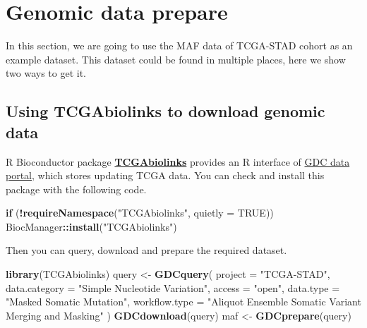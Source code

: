 \documentclass[
  12pt,
]{book}
\newenvironment{Shaded}{\begin{snugshade}}{\end{snugshade}}
\newcommand{\AttributeTok}[1]{\textcolor[rgb]{0.13,0.29,0.53}{#1}}
\newcommand{\ConstantTok}[1]{\textcolor[rgb]{0.56,0.35,0.01}{#1}}
\newcommand{\ControlFlowTok}[1]{\textcolor[rgb]{0.13,0.29,0.53}{\textbf{#1}}}
\newcommand{\FunctionTok}[1]{\textcolor[rgb]{0.13,0.29,0.53}{\textbf{#1}}}
\newcommand{\NormalTok}[1]{#1}
\newcommand{\OtherTok}[1]{\textcolor[rgb]{0.56,0.35,0.01}{#1}}
\newcommand{\SpecialCharTok}[1]{\textcolor[rgb]{0.81,0.36,0.00}{\textbf{#1}}}
\newcommand{\StringTok}[1]{\textcolor[rgb]{0.31,0.60,0.02}{#1}}
\begin{document}
\hypertarget{genomic-data-prepare}{%
\section{Genomic data prepare}\label{genomic-data-prepare}}

In this section, we are going to use the MAF data of TCGA-STAD cohort as an example dataset. This dataset could be found in multiple places, here we show two ways to get it.

\hypertarget{using-tcgabiolinks-to-download-genomic-data}{%
\subsection{Using TCGAbiolinks to download genomic data}\label{using-tcgabiolinks-to-download-genomic-data}}

R Bioconductor package \textbf{\href{https://bioconductor.org/packages/TCGAbiolinks/}{TCGAbiolinks}} provides an R interface of \href{https://portal.gdc.cancer.gov/}{GDC data portal}, which stores updating TCGA data. You can check and install this package with the following code.

\begin{Shaded}
\begin{Highlighting}[]
\ControlFlowTok{if}\NormalTok{ (}\SpecialCharTok{!}\FunctionTok{requireNamespace}\NormalTok{(}\StringTok{"TCGAbiolinks"}\NormalTok{, }\AttributeTok{quietly =} \ConstantTok{TRUE}\NormalTok{))}
\NormalTok{  BiocManager}\SpecialCharTok{::}\FunctionTok{install}\NormalTok{(}\StringTok{"TCGAbiolinks"}\NormalTok{)}
\end{Highlighting}
\end{Shaded}

Then you can query, download and prepare the required dataset.

\begin{Shaded}
\begin{Highlighting}[]
\FunctionTok{library}\NormalTok{(TCGAbiolinks)}
\NormalTok{query }\OtherTok{\textless{}{-}} \FunctionTok{GDCquery}\NormalTok{(}
  \AttributeTok{project =} \StringTok{"TCGA{-}STAD"}\NormalTok{, }
  \AttributeTok{data.category =} \StringTok{"Simple Nucleotide Variation"}\NormalTok{, }
  \AttributeTok{access =} \StringTok{"open"}\NormalTok{,}
  \AttributeTok{data.type =} \StringTok{"Masked Somatic Mutation"}\NormalTok{, }
  \AttributeTok{workflow.type =} \StringTok{"Aliquot Ensemble Somatic Variant Merging and Masking"}
\NormalTok{)}
\FunctionTok{GDCdownload}\NormalTok{(query)}
\NormalTok{maf }\OtherTok{\textless{}{-}} \FunctionTok{GDCprepare}\NormalTok{(query)}
\end{Highlighting}
\end{Shaded}
\end{document}
